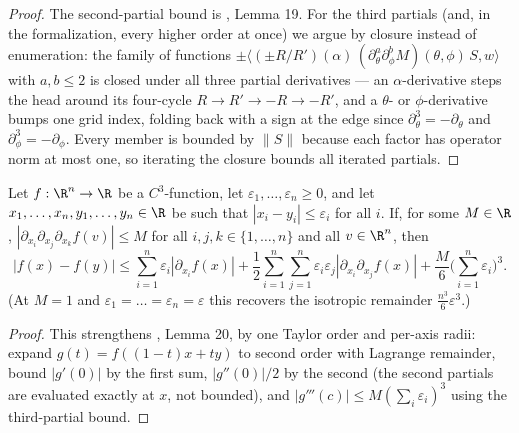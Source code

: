 \begin{proof}\leanok
The second-partial bound is \cite{polyhedron.without.rupert}, Lemma 19.  For
the third partials (and, in the formalization, every higher order at once) we
argue by closure instead of enumeration: the family of functions
$\pm \langle (\pm R/R')(\alpha)\, (\partial_\theta^a \partial_\phi^b
M)(\theta,\phi)\, S, w\rangle$ with $a, b \le 2$ is closed under all three
partial derivatives --- an $\alpha$-derivative steps the head around its
four-cycle $R \to R' \to -R \to -R'$, and a $\theta$- or $\phi$-derivative
bumps one grid index, folding back with a sign at the edge since
$\partial_\theta^3 = -\partial_\theta$ and
$\partial_\phi^3 = -\partial_\phi$.  Every member is bounded by $\|S\|$
because each factor has operator norm at most one, so iterating the closure
bounds all iterated partials.
\end{proof}

\begin{lemma} \label{lem:n2}
\leanok
    Let $f:\R^n\to \R$ be a $C^3$-function, let
    $\varepsilon_1,\dots,\varepsilon_n \geq 0$, and let
    $x_1,\dots,x_n,y_1,\dots,y_n \in \R$ be such that
    $|x_i-y_i|\leq \varepsilon_i$ for all $i$.
    If, for some $M \in \R$,
    \(
        \left|\partial_{x_i}\partial_{x_j}\partial_{x_k}f(v)\right| \leq M
    \)
    for all $i,j,k \in \{1,\dots,n\}$ and all $v \in \R^n$, then
    \[
    |f(x)-f(y)|\leq \sum_{i=1}^n \varepsilon_i |\partial_{x_i} f(x)|
      + \frac{1}{2} \sum_{i=1}^n \sum_{j=1}^n \varepsilon_i \varepsilon_j
          |\partial_{x_i}\partial_{x_j} f(x)|
      + \frac{M}{6}\Big(\sum_{i=1}^n \varepsilon_i\Big)^3.
    \]
    (At $M = 1$ and $\varepsilon_1 = \dots = \varepsilon_n = \varepsilon$ this
    recovers the isotropic remainder $\frac{n^3}{6}\varepsilon^3$.)
\end{lemma}

\begin{proof}
\leanok
This strengthens \cite{polyhedron.without.rupert}, Lemma 20, by one Taylor
order and per-axis radii: expand $g(t) = f((1-t)x + ty)$ to second order with
Lagrange remainder, bound $|g'(0)|$ by the first sum, $|g''(0)|/2$ by the
second (the second partials are evaluated exactly at $x$, not bounded), and
$|g'''(c)| \le M (\sum_i \varepsilon_i)^3$ using the third-partial bound.
\end{proof}

